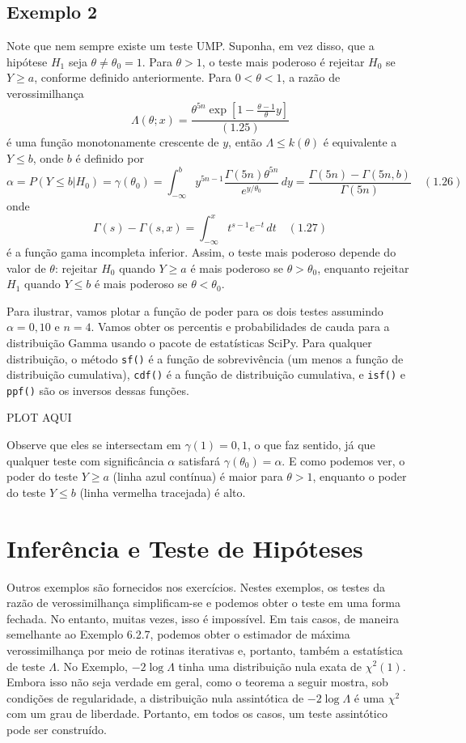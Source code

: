 \documentclass[12pt]{report}
\begin{document}
\subsection{Exemplo 2}

Note que nem sempre existe um teste UMP. Suponha, em vez disso, que a hipótese \(H_1\) seja \(\theta \neq \theta_0 = 1\). Para \(\theta > 1\), o teste mais poderoso é rejeitar \(H_0\) se \(Y \geq a\), conforme definido anteriormente. Para \(0 < \theta < 1\), a razão de verossimilhança
\[
\Lambda(\theta; x) = \frac{\theta^{5n} \exp\left[1 - \frac{\theta - 1}{\theta}y\right]}{(1.25)}
\]
é uma função monotonamente crescente de \(y\), então \(\Lambda \leq k(\theta)\) é equivalente a \(Y \leq b\), onde \(b\) é definido por
\[
\alpha = P(Y \leq b|H_0) = \gamma(\theta_0) = \int_{-\infty}^{b} y^{5n-1} \frac{\Gamma(5n)\theta^{5n}}{e^{y/\theta_0}} \, dy = \frac{\Gamma(5n) - \Gamma(5n, b)}{\Gamma(5n)} \quad (1.26)
\]
onde
\[
\Gamma(s) - \Gamma(s, x) = \int_{-\infty}^{x} t^{s-1} e^{-t} \, dt \quad (1.27)
\]
é a função gama incompleta inferior. Assim, o teste mais poderoso depende do valor de \(\theta\): rejeitar \(H_0\) quando \(Y \geq a\) é mais poderoso se \(\theta > \theta_0\), enquanto rejeitar \(H_1\) quando \(Y \leq b\) é mais poderoso se \(\theta < \theta_0\).

Para ilustrar, vamos plotar a função de poder para os dois testes assumindo \(\alpha = 0,10\) e \(n = 4\). Vamos obter os percentis e probabilidades de cauda para a distribuição Gamma usando o pacote de estatísticas SciPy. Para qualquer distribuição, o método \texttt{sf()} é a função de sobrevivência (um menos a função de distribuição cumulativa), \texttt{cdf()} é a função de distribuição cumulativa, e \texttt{isf()} e \texttt{ppf()} são os inversos dessas funções.

PLOT AQUI

Observe que eles se intersectam em $\gamma(1) = 0,1$, o que faz sentido, já que qualquer teste com significância $\alpha$ satisfará $\gamma(\theta_0) = \alpha$. E como podemos ver, o poder do teste $Y \geq a$ (linha azul contínua) é maior para $\theta > 1$, enquanto o poder do teste $Y \leq b$ (linha vermelha tracejada) é alto.

\section{Inferência e Teste de Hipóteses}

Outros exemplos são fornecidos nos exercícios. Nestes exemplos, os testes da razão de verossimilhança simplificam-se e podemos obter o teste em uma forma fechada. No entanto, muitas vezes, isso é impossível. Em tais casos, de maneira semelhante ao Exemplo 6.2.7, podemos obter o estimador de máxima verossimilhança por meio de rotinas iterativas e, portanto, também a estatística de teste $\Lambda$. No Exemplo, $-2 \log \Lambda$ tinha uma distribuição nula exata de $\chi^2(1)$. Embora isso não seja verdade em geral, como o teorema a seguir mostra, sob condições de regularidade, a distribuição nula assintótica de $-2 \log \Lambda$ é uma $\chi^2$ com um grau de liberdade. Portanto, em todos os casos, um teste assintótico pode ser construído.
\end{document}
